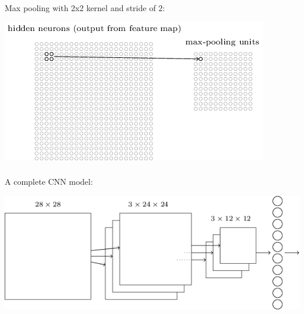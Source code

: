 \documentclass[xetex,mathserif,serif,aspectratio=169]{beamer}
\begin{document}
\begin{frame}[fragile] \frametitle{} \oldB \small


Max pooling with 2x2 kernel and stride of $2$:

\begin{center}
\includegraphics[height=0.66\textheight]{img/tikz47.png}
\end{center}

\end{frame}

\begin{frame}[fragile] \frametitle{} \oldB \small


A complete CNN model:

\begin{center}
\includegraphics[height=0.5\textheight]{img/tikz49.png}
\end{center}

\end{frame}
\end{document}
